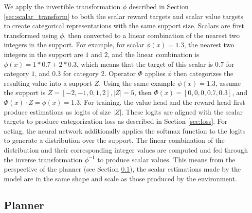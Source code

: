 We apply the invertible transformation \( \phi \) described in Section \ref{sec:scalar_transform} to both the scalar reward targets and scalar value targets to create categorical representations with the same support size.
Scalars are first transformed using \( \phi \), then converted to a linear combination of the nearest two integers in the support.
For example, for scalar \(\phi(x) = 1.3\), the nearest two integers in the support are $1$ and $2$, and the linear combination is \( \phi(x) = 1 * 0.7 + 2 * 0.3 \), which means that the target of this scalar is $0.7$ for category $1$, and $0.3$ for category $2$.
Operator $\Phi$ applies $\phi$ then categorizes the resulting value into a support $Z$.
Using the same example $\phi(x) = 1.3$, assume the support is $Z = [-2, -1, 0, 1, 2], |Z| = 5$,
then $\Phi(x) = [0, 0, 0, 0.7, 0.3]$, and $\Phi(x) \cdot Z = \phi(x) = 1.3$.
For training, the value head and the reward head first produce estimations as logits of size $|Z|$.
These logits are aligned with the scalar targets to produce categorization loss as described in Section \ref{sec:loss}.
For acting, the neural network additionally applies the softmax function to the logits to generate a distribution over the support.
The linear combination of the distribution and their corresponding integer values are computed and fed through the inverse transformation \( \phi^{-1}\) to produce scalar values.
This means from the perspective of the planner (see Section \ref{sec:planner}), the scalar estimations made by the model are in the same shape and scale as those produced by the environment.

\subsection{Planner} \label{sec:planner}

